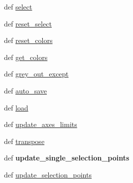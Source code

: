 \begin{DoxyCompactItemize}
\item 
def \hyperlink{classModules_1_1Selection_1_1Selector_a773c514f0089ddf5c057b925756aa7df}{select}
\item 
def \hyperlink{classModules_1_1Selection_1_1Selector_a86dca218c5925c039f043d8a6c4ac2a0}{reset\-\_\-select}
\item 
def \hyperlink{classModules_1_1Selection_1_1Selector_acc5edd2eccc27a9d568a460825d5f0df}{reset\-\_\-colors}
\item 
def \hyperlink{classModules_1_1Selection_1_1Selector_ac0d83b3bbc909098f895e9091dfb3dc2}{get\-\_\-colors}
\item 
def \hyperlink{classModules_1_1Selection_1_1Selector_a522a482a5a06c27be58b6536ad313d18}{grey\-\_\-out\-\_\-except}
\item 
def \hyperlink{classModules_1_1Selection_1_1Selector_abb805a39768ab091c5aa82292fe9a598}{auto\-\_\-save}
\item 
def \hyperlink{classModules_1_1Selection_1_1Selector_a3a1b957e229d6df197a646fb644462bc}{load}
\item 
def \hyperlink{classModules_1_1Selection_1_1Selector_ad15da1910bf79b7f47e4b191ea110145}{update\-\_\-axes\-\_\-limits}
\item 
def \hyperlink{classModules_1_1Selection_1_1Selector_acbcd93aa4d2fa456b540473789975d41}{transpose}
\item 
\hypertarget{classModules_1_1Selection_1_1Selector_ae6b76aa003b906bbe20c2d6a1e39ed28}{def {\bfseries update\-\_\-single\-\_\-selection\-\_\-points}}\label{classModules_1_1Selection_1_1Selector_ae6b76aa003b906bbe20c2d6a1e39ed28}

\item 
def \hyperlink{classModules_1_1Selection_1_1Selector_adba81b4dad3311cadcef43ac92cefc00}{update\-\_\-selection\-\_\-points}
\end{DoxyCompactItemize}

